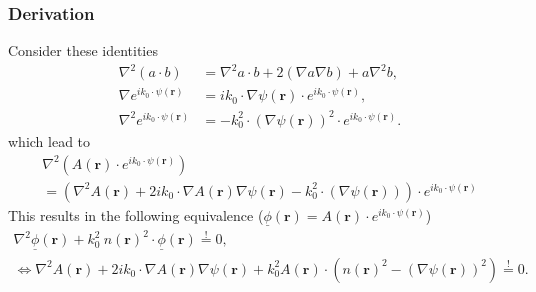 \subsubsection{Derivation}\label{derivation}

Consider these identities
\begin{align}
    \nabla^2 (a \cdot b) &= \nabla^2 a \cdot b + 2 (\nabla a \nabla b) + a \nabla^2 b, \\
    \nabla e^{i k_0 \cdot \psi(\mathbf{r})} &= i k_0 \cdot \nabla \psi(\mathbf{r}) \cdot e^{i k_0 \cdot \psi(\mathbf{r})}, \\
    \nabla^2 e^{i k_0 \cdot \psi(\mathbf{r})} &= - k_0^2 \cdot {(\nabla \psi(\mathbf{r}))}^2 \cdot e^{i k_0 \cdot \psi(\mathbf{r})}.
\end{align}
which lead to
\begin{gather}
    \nabla^2 (A(\mathbf{r}) \cdot e^{ik_0 \cdot \psi(\mathbf{r})}) \\
    = (\nabla^2 A(\mathbf{r}) + 2ik_0 \cdot \nabla A(\mathbf{r}) \nabla \psi(\mathbf{r}) - k_0^2 \cdot (\nabla \psi(\mathbf{r}))) \cdot e^{ik_0 \cdot \psi(\mathbf{r})}
\end{gather}
This results in the following equivalence (\(\underline{\phi}(\mathbf{r}) = A(\mathbf{r}) \cdot e^{ik_0 \cdot \psi(\mathbf{r})}\))
\begin{gather}
    \nabla^2 \underline{\phi}(\mathbf{r}) + k_0^2\ n{(\mathbf{r})}^2 \cdot \underline{\phi}(\mathbf{r}) \stackrel{!}{=} 0, \\
    \Leftrightarrow \nabla^2 A(\mathbf{r}) + 2ik_0 \cdot \nabla A(\mathbf{r}) \nabla \psi(\mathbf{r}) + k_0^2 A(\mathbf{r}) \cdot ({n(\mathbf{r})}^2 - {(\nabla \psi(\mathbf{r}))}^2) \stackrel{!}{=} 0.
\end{gather}